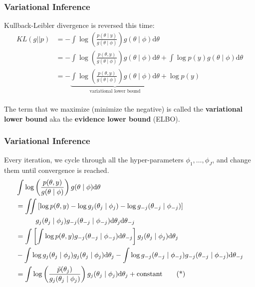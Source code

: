 \documentclass{beamer}
\begin{document}
\begin{frame}[fragile]
\frametitle{Variational Inference}

Kullback-Leibler divergence is reversed this time:
\begin{align*}
KL(g || p) &= - \int \log \left( \frac{ p(\theta \mid y)}{g(\theta \mid \phi)} \right) g(\theta \mid \phi)\text{d}\theta  \\
&= - \int \log \left( \frac{ p(\theta, y)}{g(\theta \mid \phi)} \right) g(\theta \mid \phi)\text{d}\theta
+ \int \log p(y)g(\theta \mid \phi) \text{d}\theta \\
&= - \underbrace{\int \log \left( \frac{ p(\theta, y)}{g(\theta \mid \phi)} \right) g(\theta \mid \phi)\text{d}\theta}_{\text{variational lower bound}}
+  \log p(y) \\
\end{align*}

The term that we maximize (minimize the negative) is called the {\bf variational lower bound} aka the {\bf evidence lower bound} (ELBO).

\end{frame}

\begin{frame}[fragile]
\frametitle{Variational Inference}

Every iteration, we cycle through all the hyper-parameters $\phi_1, \ldots, \phi_J$, and change them until convergence is reached.
\begin{align*}
&\int \log \left( \frac{ p(\theta, y)}{g(\theta \mid \phi)} \right) g(\theta \mid \phi)\text{d}\theta \\
&=  \iint \left[\log p(\theta, y) - \log g_j(\theta_j \mid \phi_j) - \log g_{-j}(\theta_{-j} \mid \phi_{-j})\right]  \\
&\hspace{10mm} g_j(\theta_j \mid \phi_j)g_{-j}(\theta_{-j} \mid \phi_{-j})\text{d}\theta_{j}\text{d}\theta_{-j} \\
&=  \int \left[\int\log p(\theta, y)g_{-j}(\theta_{-j} \mid \phi_{-j}) \text{d}\theta_{-j}\right] g_j(\theta_j \mid \phi_j)\text{d}\theta_{j} \\
&- \int\log g_j(\theta_j \mid \phi_j)g_j(\theta_j \mid \phi_j)\text{d}\theta_j - \int \log g_{-j}(\theta_{-j} \mid \phi_{-j})g_{-j}(\theta_{-j} \mid \phi_{-j})\text{d}\theta_{-j} \\ 
&=  \int  \log \left(\frac{\tilde{p}(\theta_j)}{g_j(\theta_j \mid \phi_j)}  \right) g_j(\theta_j \mid \phi_j)\text{d}\theta_{j} + \text{constant} \tag{*}
\end{align*}

\end{frame}
\end{document}

